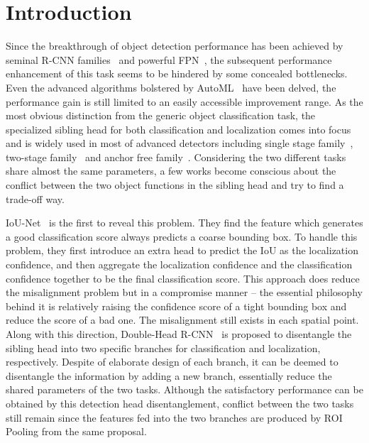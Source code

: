 \documentclass[10pt,twocolumn,letterpaper]{article}
\begin{document}
\section{Introduction}
Since the breakthrough of object detection performance has been achieved by seminal R-CNN families~\cite{girshick2015region,girshick2015fast,ren2015faster} and powerful FPN~\cite{lin2017feature}, the subsequent performance enhancement of this task seems to be hindered by some concealed bottlenecks.
Even the advanced algorithms bolstered by AutoML~\cite{ghiasi2019fpn,Xu_2019_ICCV} have been delved, the performance gain is still limited to an easily accessible improvement range.
As the most obvious distinction from the generic object classification task, the specialized sibling head for both classification and localization comes into focus and is widely used in most of advanced detectors including single stage family~\cite{liu2016ssd,song2018beyond,hao2017scale}, two-stage family~\cite{dai2017deformable,li2019gradient,zeng2017crafting,liu2017recurrent,li2019zoom} and anchor free family~\cite{law2018cornernet}.
Considering the two different tasks share almost the same parameters, a few works become conscious about the conflict between the two object functions in the sibling head and try to find a trade-off way.

IoU-Net~\cite{jiang2018acquisition} is the first to reveal this problem. They find the feature which generates a good classification score always predicts a coarse bounding box.
To handle this problem, they first introduce an extra head to predict the IoU as the localization confidence, and then aggregate the localization confidence and the classification confidence together to be the final classification score. This approach does reduce the misalignment problem but in a compromise manner -- the essential philosophy behind it is relatively raising the confidence score of a tight bounding box and reduce the score of a bad one. The misalignment still exists in each spatial point. 
Along with this direction, Double-Head R-CNN~\cite{wu2019rethinking} is proposed to disentangle the sibling head into two specific branches for classification and localization, respectively. Despite of elaborate design of each branch, it can be deemed to disentangle the information by adding a new branch, essentially reduce the shared parameters of the two tasks.
Although the satisfactory performance can be obtained by this detection head disentanglement, conflict between the two tasks still remain since the features fed into the two branches are produced by ROI Pooling from the same proposal.
\end{document}
